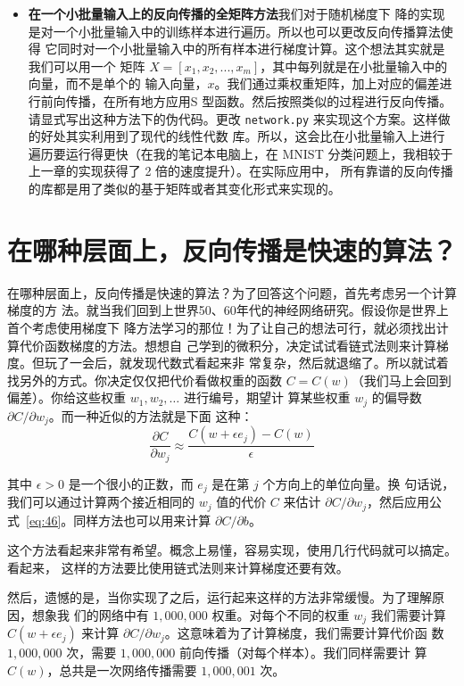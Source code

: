 \begin{itemize}
\item \textbf{在一个小批量输入上的反向传播的全矩阵方法}\quad 我们对于随机梯度下
  降的实现是对一个小批量输入中的训练样本进行遍历。所以也可以更改反向传播算法使得
  它同时对一个小批量输入中的所有样本进行梯度计算。这个想法其实就是我们可以用一个
  矩阵 $X=[x_1, x_2, ..., x_m]$，其中每列就是在小批量输入中的向量，而不是单个的
  输入向量，$x$。我们通过乘权重矩阵，加上对应的偏差进行前向传播，在所有地方应用S
  型函数。然后按照类似的过程进行反向传播。请显式写出这种方法下的伪代码。更改
  \lstinline!network.py! 来实现这个方案。这样做的好处其实利用到了现代的线性代数
  库。所以，这会比在小批量输入上进行遍历要运行得更快（在我的笔记本电脑上，在
    MNIST 分类问题上，我相较于上一章的实现获得了 2 倍的速度提升）。在实际应用中，
  所有靠谱的反向传播的库都是用了类似的基于矩阵或者其变化形式来实现的。
\end{itemize}

\section{在哪种层面上，反向传播是快速的算法？}

在哪种层面上，反向传播是快速的算法？为了回答这个问题，首先考虑另一个计算梯度的方
法。就当我们回到上世界50、60年代的神经网络研究。假设你是世界上首个考虑使用梯度下
降方法学习的那位！为了让自己的想法可行，就必须找出计算代价函数梯度的方法。想想自
己学到的微积分，决定试试看链式法则来计算梯度。但玩了一会后，就发现代数式看起来非
常复杂，然后就退缩了。所以就试着找另外的方式。你决定仅仅把代价看做权重的函数 $C
= C(w)$（我们马上会回到偏差）。你给这些权重 $w_1, w_2, \ldots$ 进行编号，期望计
算某些权重 $w_j$ 的偏导数 $\partial C / \partial w_j$。而一种近似的方法就是下面
这种：
\begin{equation}
  \frac{\partial
    C}{\partial w_{j}} \approx \frac{C(w+\epsilon
    e_j)-C(w)}{\epsilon}
  \label{eq:46}\tag{46}
\end{equation}

其中 $\epsilon > 0$ 是一个很小的正数，而 $e_j$ 是在第 $j$ 个方向上的单位向量。换
句话说，我们可以通过计算两个接近相同的 $w_j$ 值的代价 $C$ 来估计 $\partial
C/\partial w_j$，然后应用公式~\eqref{eq:46}。同样方法也可以用来计算 $\partial
C/\partial b$。

这个方法看起来非常有希望。概念上易懂，容易实现，使用几行代码就可以搞定。看起来，
这样的方法要比使用链式法则来计算梯度还要有效。

然后，遗憾的是，当你实现了之后，运行起来这样的方法非常缓慢。为了理解原因，想象我
们的网络中有 $1,000,000$ 权重。对每个不同的权重 $w_j$ 我们需要计算 $C(w+\epsilon
e_j)$ 来计算 $\partial C/\partial w_j$。这意味着为了计算梯度，我们需要计算代价函
数 $1, 000, 000 $ 次，需要 $1, 000, 000$ 前向传播（对每个样本）。我们同样需要计
算 $C(w)$，总共是一次网络传播需要 $1,000,001$ 次。

